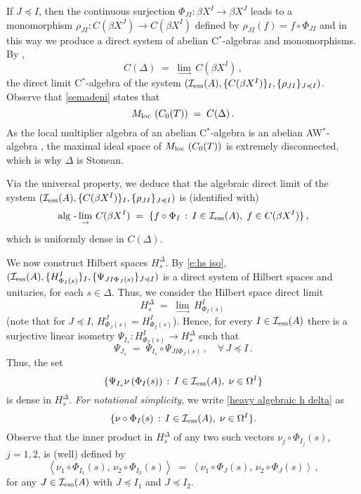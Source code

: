 \documentclass{amsart}
\theoremstyle{definition}
\theoremstyle{remark}
\begin{document}
If $J\preccurlyeq I$, then the continuous surjection $\Phi_{JI}:\beta X^I\rightarrow\beta X^J$ leads to a monomorphism $\rho_{JI}:C(\beta X^J)
\rightarrow C(\beta X^I)$ defined by
$\rho_{JI}(f)=f\circ\Phi_{JI}$ and in this way we produce a direct system of abelian C$^*$-algebras and monomorphisms.
By  \cite{semadeni1968},
\begin{equation}\label{semadeni}
C(\Delta) \;=\; \lim_\rightarrow\,C(\beta X^I)\,,
\end{equation}
the direct limit C$^*$-algebra of the system $( \mathcal I_{\rm ess}(A), \{C(\beta X^I)\}_{I}, \{\rho_{JI}\}_{J\preccurlyeq I})$.
Observe that \eqref{semadeni} states that
\[
{M_{\rm loc}\,}\left( C_0(T) \right) \;=\; C(\Delta)\,.
\]
As the local multiplier algebra of an abelian C$^*$-algebra is an abelian AW$^*$-algebra \cite[Proposition 3.4.5]{Ara--Mathieu-book}, the
maximal ideal space of ${M_{\rm loc}\,}\left( C_0(T) \right)$ is extremely disconnected, which is why $\Delta$ is Stonean.

Via the universal property, we deduce that the
algebraic direct limit of the system  $( \mathcal I_{\rm ess}(A), \{C(\beta X^I)\}_{I}, \{\rho_{JI}\}_{J\preccurlyeq I})$
is (identified with)
\begin{equation}\label{algebraic semadeni}
\displaystyle\mbox{\rm alg -}\lim_{\rightarrow}\,C(\beta X^I)\;=\;\{f\circ\Phi_I\,:\,I\in  \mathcal I_{\rm ess}(A),\;f\in C(\beta X^I)\}\,,
\end{equation}
which is uniformly dense in $C(\Delta)$.

We now construct Hilbert spaces $H_s^\Delta$. By \eqref{e:hs iso},
$( \mathcal I_{\rm ess}(A), \{H_{\Phi_I(s)}^I\}_{I}, \{\Psi_{JI\Phi_J(s)}\}_{J \preccurlyeq I})$
is a direct system of Hilbert spaces and unitaries, for each $s\in\Delta$.
Thus, we consider the Hilbert space direct limit
\begin{equation}\label{h delta}
H_s^\Delta\;=\;\lim_{\rightarrow}\,H_{\Phi_I(s)}^I\,
\end{equation}
(note that for $J\preccurlyeq I$, $H^J_{\Phi_J(s)}=H^I_{\Phi_I(s)}$).
Hence, for every $I\in  \mathcal I_{\rm ess}(A)$
there is a surjective linear isometry $\Psi_{I_s}:H_{\Phi_I(s)}^I\rightarrow H_s^\Delta$ such that
\[
\Psi_{J_s}\;=\;\Psi_{I_s}\circ \Psi_{JI\Phi_J(s)}\,,\quad\forall\, J \preccurlyeq I\,.
\]
Thus, the set
\begin{equation}\label{heavy algebraic h delta}
\{\Psi_{I_s}\nu\left(\Phi_I(s)\right)\,:\,I\in  \mathcal I_{\rm ess}(A),\;\nu\in\Omega^I\}
\end{equation}
is dense in $H_s^\Delta$. \emph{For notational simplicity}, we write \eqref{heavy algebraic h delta} as
\begin{equation}\label{algebraic h delta}
\{\nu\circ\Phi_I(s)\,:\,I\in  \mathcal I_{\rm ess}(A),\;\nu\in\Omega^I\}.
\end{equation}
Observe that the inner product in $H_s^\Delta$ of any two such vectors
$\nu_j\circ \Phi_{I_j}(s)$, $j=1,2$, is (well) defined by
\[
\left\langle \nu_1\circ \Phi_{I_1}(s),\,\nu_2\circ\Phi_{I_2}(s)\right\rangle \;=\;
\left\langle \nu_1\circ \Phi_{J}(s),\,\nu_2\circ\Phi_{J}(s)\right\rangle\,,
\]
for any $J\in \mathcal I_{\rm ess}(A)$ with $J \preccurlyeq I_1$ and  $J \preccurlyeq I_2$.
\end{document}
